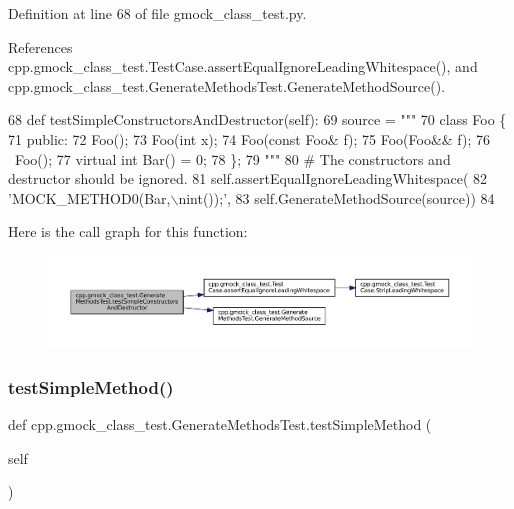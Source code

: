 Definition at line 68 of file gmock\+\_\+class\+\_\+test.\+py.



References cpp.\+gmock\+\_\+class\+\_\+test.\+Test\+Case.\+assert\+Equal\+Ignore\+Leading\+Whitespace(), and cpp.\+gmock\+\_\+class\+\_\+test.\+Generate\+Methods\+Test.\+Generate\+Method\+Source().


\begin{DoxyCode}
68   \textcolor{keyword}{def }testSimpleConstructorsAndDestructor(self):
69     source = \textcolor{stringliteral}{"""}
70 \textcolor{stringliteral}{class Foo \{}
71 \textcolor{stringliteral}{ public:}
72 \textcolor{stringliteral}{  Foo();}
73 \textcolor{stringliteral}{  Foo(int x);}
74 \textcolor{stringliteral}{  Foo(const Foo& f);}
75 \textcolor{stringliteral}{  Foo(Foo&& f);}
76 \textcolor{stringliteral}{  ~Foo();}
77 \textcolor{stringliteral}{  virtual int Bar() = 0;}
78 \textcolor{stringliteral}{\};}
79 \textcolor{stringliteral}{"""}
80     \textcolor{comment}{# The constructors and destructor should be ignored.}
81     self.assertEqualIgnoreLeadingWhitespace(
82         \textcolor{stringliteral}{'MOCK\_METHOD0(Bar,\(\backslash\)nint());'},
83         self.GenerateMethodSource(source))
84 
\end{DoxyCode}
Here is the call graph for this function\+:
\nopagebreak
\begin{figure}[H]
\begin{center}
\leavevmode
\includegraphics[width=350pt]{classcpp_1_1gmock__class__test_1_1GenerateMethodsTest_abb0adf9fa7afd25d63964a9075af1414_cgraph}
\end{center}
\end{figure}
\mbox{\label{classcpp_1_1gmock__class__test_1_1GenerateMethodsTest_a3ece43a88823e3fe1b4731819505bd61}} 
\subsubsection{\texorpdfstring{test\+Simple\+Method()}{testSimpleMethod()}}
{\footnotesize\ttfamily def cpp.\+gmock\+\_\+class\+\_\+test.\+Generate\+Methods\+Test.\+test\+Simple\+Method (\begin{DoxyParamCaption}\item[{}]{self }\end{DoxyParamCaption})}



